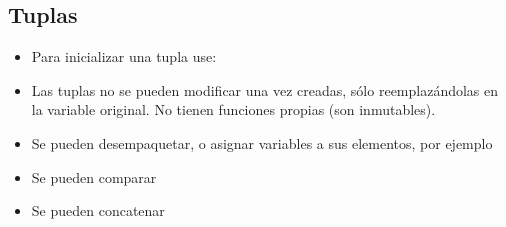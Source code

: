 \subsection*{Tuplas}

\begin{itemize}
    \item Para inicializar una tupla use:

    \item Las tuplas no se pueden modificar una vez creadas, sólo reemplazándolas en la variable original. No tienen funciones propias (son inmutables).
    \item Se pueden desempaquetar, o asignar variables a sus elementos, por ejemplo


    \item Se pueden comparar


    \item Se pueden concatenar

\end{itemize}
